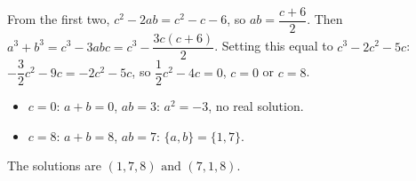 From the first two, $c^2-2ab=c^2-c-6$, so $ab=\dfrac{c+6}{2}$. Then $a^3+b^3=c^3-3abc=c^3-\dfrac{3c(c+6)}{2}$. Setting this equal to $c^3-2c^2-5c$: $-\dfrac{3}{2}c^2-9c=-2c^2-5c$, so $\dfrac{1}{2}c^2-4c=0$, $c=0$ or $c=8$.
\begin{itemize}
\item $c=0$: $a+b=0$, $ab=3$: $a^2=-3$, no real solution.
\item $c=8$: $a+b=8$, $ab=7$: $\{a,b\}=\{1,7\}$.
\end{itemize}
The solutions are $\boxed{(1,7,8)\text{ and }(7,1,8)}$.
